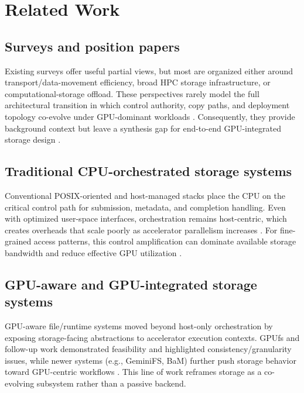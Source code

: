 \section{Related Work}

\subsection{Surveys and position papers}

Existing surveys offer useful partial views, but most are organized either around transport/data-movement efficiency, broad HPC storage infrastructure, or computational-storage offload. These perspectives rarely model the full architectural transition in which control authority, copy paths, and deployment topology co-evolve under GPU-dominant workloads \cite{zhang2025hpcstoragesurvey,traub2023compstoragesurvey,liu2017rackscale}. Consequently, they provide background context but leave a synthesis gap for end-to-end GPU-integrated storage design \cite{murray2021tfdata,rajbhandari2021zeroinfinity}.

\subsection{Traditional CPU-orchestrated storage systems}

Conventional POSIX-oriented and host-managed stacks place the CPU on the critical control path for submission, metadata, and completion handling. Even with optimized user-space interfaces, orchestration remains host-centric, which creates overheads that scale poorly as accelerator parallelism increases \cite{linux_io_uring,spdk_overview,nvme_spec}. For fine-grained access patterns, this control amplification can dominate available storage bandwidth and reduce effective GPU utilization \cite{murray2021tfdata,hoard2018}.

\subsection{GPU-aware and GPU-integrated storage systems}

GPU-aware file/runtime systems moved beyond host-only orchestration by exposing storage-facing abstractions to accelerator execution contexts. GPUfs and follow-up work demonstrated feasibility and highlighted consistency/granularity issues, while newer systems (e.g., GeminiFS, BaM) further push storage behavior toward GPU-centric workflows \cite{silberstein2013gpufs,shahar2016gpufs,geminifs2025,qureshi2023bam}. This line of work reframes storage as a co-evolving subsystem rather than a passive backend.

